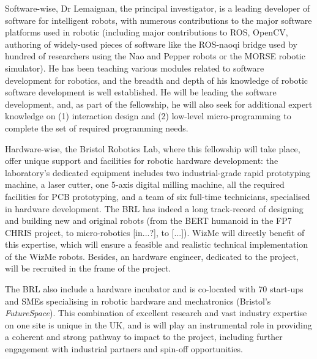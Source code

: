 \documentclass[]{article}
\newcommand{\project}{WizMe\xspace}
\begin{document}
Software-wise, Dr Lemaignan, the principal investigator, is a leading
developer of software for intelligent robots, with numerous contributions to
the major software platforms used in robotic (including major contributions to
ROS, OpenCV, authoring of widely-used pieces of software like the ROS-naoqi
bridge used by hundred of researchers using the Nao and Pepper robots or the
MORSE robotic simulator). He has been teaching various modules related to
software development for robotics, and the breadth and depth of his knowledge of
robotic software development is well established. He will be leading the
software development, and, as part of the fellowship, he will also seek for
additional expert knowledge on (1) interaction design and (2) low-level
micro-programming to complete the set of required programming needs.

Hardware-wise, the Bristol Robotics Lab, where this fellowship will take place,
offer unique support and facilities for robotic hardware development: the
laboratory's dedicated equipment includes two industrial-grade rapid prototyping
machine, a laser cutter, one 5-axis digital milling machine, all the required
facilities for PCB prototyping, and a team of six full-time technicians,
specialised in hardware development. The BRL has indeed a long track-record of
designing and building new and original robots (from the BERT humanoid in the
FP7 CHRIS project, to micro-robotics [in...?], to [...]). \project will directly
benefit of this expertise, which will ensure a feasible and realistic technical
implementation of the \project robots. Besides, an hardware engineer, dedicated
to the project, will be recruited in the frame of the project.

The BRL also include a hardware incubator and is co-located with 70 start-ups
and SMEs specialising in robotic hardware and mechatronics (Bristol's
\emph{FutureSpace}). This combination of excellent research and vast industry
expertise on one site is unique in the UK, and is will play an instrumental role
in providing a coherent and strong pathway to impact to the project, including
further engagement with industrial partners and spin-off opportunities.








\end{document}
